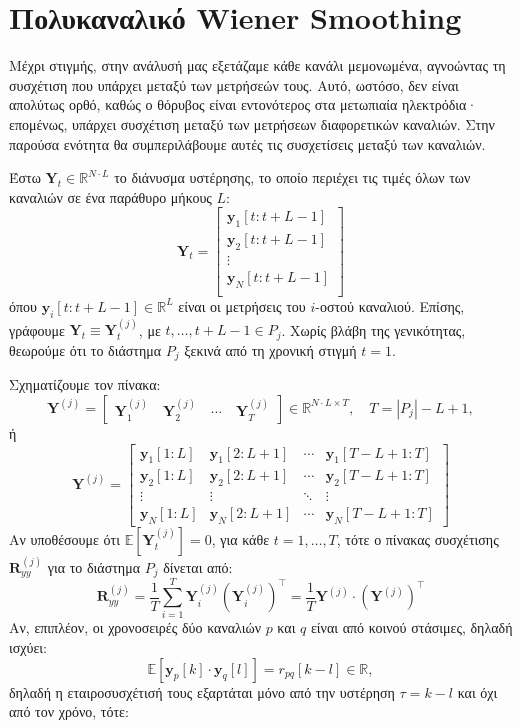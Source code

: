 \documentclass[a4paper,12pt]{article}
\begin{document}
\section*{Πολυκαναλικό Wiener Smoothing}
Μέχρι στιγμής, στην ανάλυσή μας εξετάζαμε κάθε κανάλι μεμονωμένα, αγνοώντας τη συσχέτιση που υπάρχει μεταξύ 
των μετρήσεών τους. Αυτό, ωστόσο, δεν είναι απολύτως ορθό, καθώς ο θόρυβος είναι εντονότερος στα μετωπιαία 
ηλεκτρόδια· επομένως, υπάρχει συσχέτιση μεταξύ των μετρήσεων διαφορετικών καναλιών. Στην παρούσα ενότητα θα 
συμπεριλάβουμε αυτές τις συσχετίσεις μεταξύ των καναλιών.

Έστω $\mathbf{Y}_t \in \mathbb{R}^{N \cdot L}$ το διάνυσμα υστέρησης, το οποίο περιέχει τις τιμές όλων των
καναλιών σε ένα παράθυρο μήκους $L$:
\[
\mathbf{Y}_t = 
\begin{bmatrix}
    \mathbf{y}_1[t:t+L-1] \\
    \mathbf{y}_2[t:t+L-1] \\
    \vdots \\
    \mathbf{y}_N[t:t+L-1] \\
\end{bmatrix}
\]
όπου $\mathbf{y}_i[t : t + L - 1] \in \mathbb{R}^L$ είναι οι μετρήσεις του $i$-οστού καναλιού.  
Επίσης, γράφουμε $\mathbf{Y}_t \equiv \mathbf{Y}_t^{(j)}$, με $t, \ldots, t + L - 1 \in P_j$.  
Χωρίς βλάβη της γενικότητας, θεωρούμε ότι το διάστημα $P_j$ ξεκινά από τη χρονική στιγμή $t = 1$.

Σχηματίζουμε τον πίνακα:
\[
\mathbf{Y}^{(j)} = 
\begin{bmatrix}
\mathbf{Y}_1^{(j)} \quad \mathbf{Y}_2^{(j)} \quad \cdots \quad \mathbf{Y}_T^{(j)}
\end{bmatrix}
\in \mathbb{R}^{N \cdot L \times T}, \quad T = |P_j| - L + 1,
\]
ή
\[
\mathbf{Y}^{(j)} = 
\begin{bmatrix}
    \mathbf{y}_1[1:L] & \mathbf{y}_1[2:L+1] & \cdots & \mathbf{y}_1[T-L+1:T] \\
    \mathbf{y}_2[1:L] & \mathbf{y}_2[2:L+1] & \cdots & \mathbf{y}_2[T-L+1:T] \\
    \vdots & \vdots & \ddots & \vdots \\
    \mathbf{y}_N[1:L] & \mathbf{y}_N[2:L+1] & \cdots & \mathbf{y}_N[T-L+1:T]
\end{bmatrix}
\]
Αν υποθέσουμε ότι $\mathbb{E}[\mathbf{Y}_t^{(j)}] = 0$, για κάθε $t = 1, \ldots, T$,  
τότε ο πίνακας συσχέτισης $\mathbf{R}_{yy}^{(j)}$ για το διάστημα $P_j$ δίνεται από:
\[
\mathbf{R}_{yy}^{(j)} = 
\frac{1}{T} \sum_{i=1}^T \mathbf{Y}_i^{(j)} \left(\mathbf{Y}_i^{(j)}\right)^{\top} = 
\frac{1}{T} \mathbf{Y}^{(j)} \cdot \left(\mathbf{Y}^{(j)}\right)^{\top}
\]
Αν, επιπλέον, οι χρονοσειρές δύο καναλιών $p$ και $q$ είναι από κοινού στάσιμες,  
δηλαδή ισχύει:
\[
\mathbb{E}[\mathbf{y}_p[k] \cdot \mathbf{y}_q[l]] = r_{pq}[k - l] \in \mathbb{R},
\]
δηλαδή η εταιροσυσχέτισή τους εξαρτάται μόνο από την υστέρηση $\tau = k - l$ και όχι από τον χρόνο, τότε:
\end{document}
